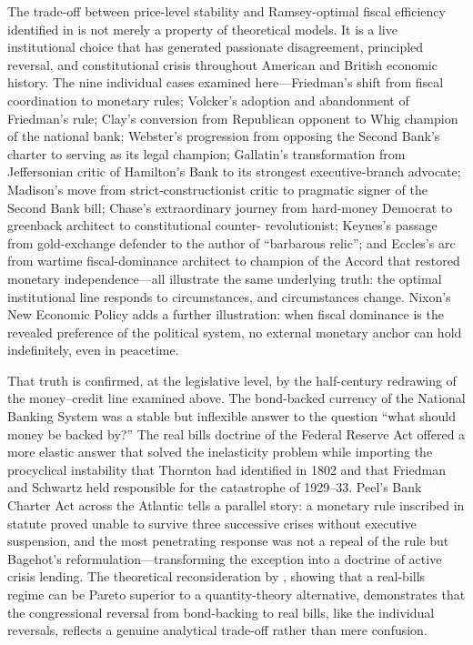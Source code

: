 \documentclass[12pt]{article}
\begin{document}
The trade-off between price-level stability and Ramsey-optimal fiscal
efficiency identified in \citet{Sargent2011} is not merely a property of
theoretical models.  It is a live institutional choice that has generated
passionate disagreement, principled reversal, and constitutional crisis
throughout American and British economic history.  The nine individual
cases examined here---Friedman's shift from fiscal coordination to
monetary rules; Volcker's adoption and abandonment of Friedman's rule;
Clay's conversion from Republican opponent to Whig champion of the
national bank; Webster's progression from opposing the Second Bank's
charter to serving as its legal champion; Gallatin's transformation from
Jeffersonian critic of Hamilton's Bank to its strongest executive-branch
advocate; Madison's move from strict-constructionist critic to pragmatic
signer of the Second Bank bill; Chase's extraordinary journey from
hard-money Democrat to greenback architect to constitutional counter-
revolutionist; Keynes's passage from gold-exchange defender to the
author of ``barbarous relic''; and Eccles's arc from wartime
fiscal-dominance architect to champion of the Accord that restored
monetary independence---all illustrate the same underlying truth:
the optimal institutional line responds to circumstances, and
circumstances change.  Nixon's New Economic Policy adds a further
illustration: when fiscal dominance is the revealed preference of the
political system, no external monetary anchor can hold indefinitely, even
in peacetime.

That truth is confirmed, at the legislative level, by the half-century
redrawing of the money--credit line examined above.  The bond-backed
currency of the National Banking System was a stable but inflexible
answer to the question ``what should money be backed by?''  The real
bills doctrine of the Federal Reserve Act offered a more elastic answer
that solved the inelasticity problem while importing the procyclical
instability that Thornton had identified in 1802 and that Friedman and
Schwartz held responsible for the catastrophe of 1929--33.  Peel's Bank
Charter Act across the Atlantic tells a parallel story: a monetary rule
inscribed in statute proved unable to survive three successive crises
without executive suspension, and the most penetrating response was not
a repeal of the rule but Bagehot's reformulation---transforming the
exception into a doctrine of active crisis lending.  The theoretical
reconsideration by \citet{SargentWallace1982}, showing that a real-bills
regime can be Pareto superior to a quantity-theory alternative,
demonstrates that the congressional reversal from bond-backing to real
bills, like the individual reversals, reflects a genuine analytical
trade-off rather than mere confusion.
\end{document}
